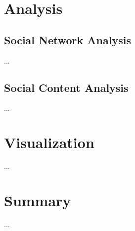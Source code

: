 \documentclass[12pt,journal,compsoc]{IEEEtran}
\begin{document}
\section{Analysis}
\subsection{Social Network Analysis}
...

\subsection{Social Content Analysis}
...

\section{Visualization}
...

\section{Summary}
...


\nocite{*}
\printbibliography
\end{document}
